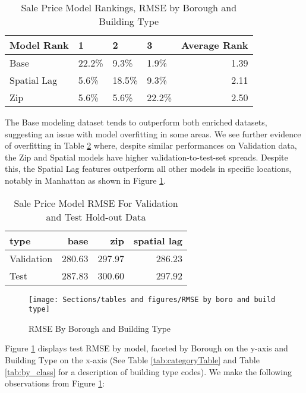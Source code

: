 \documentclass[12pt,]{article}
\begin{document}
\begin{table}

\caption{\label{tab:Sale Price Model Rank Distributions}\label{tab:SalePriceModelRank} Sale Price Model Rankings, RMSE by Borough and Building Type}
\centering
\begin{tabular}[t]{llllr}
\toprule
Model Rank & 1 & 2 & 3 & Average Rank\\
\midrule
Base & 22.2\% & 9.3\% & 1.9\% & 1.39\\
Spatial Lag & 5.6\% & 18.5\% & 9.3\% & 2.11\\
Zip & 5.6\% & 5.6\% & 22.2\% & 2.50\\
\bottomrule
\end{tabular}
\end{table}

The Base modeling dataset tends to outperform both enriched datasets,
suggesting an issue with model overfitting in some areas. We see further
evidence of overfitting in Table \ref{tab:SalePriceEval} where, despite
similar performances on Validation data, the Zip and Spatial models have
higher validation-to-test-set spreads. Despite this, the Spatial Lag
features outperform all other models in specific locations, notably in
Manhattan as shown in Figure \ref{fig:RMSE by boro and build type}.

\begin{table}

\caption{\label{tab:Sale Price Evaluations}\label{tab:SalePriceEval} Sale Price Model RMSE For Validation and Test Hold-out Data}
\centering
\begin{tabular}[t]{lrrr}
\toprule
type & base & zip & spatial lag\\
\midrule
Validation & 280.63 & 297.97 & 286.23\\
Test & 287.83 & 300.60 & 297.92\\
\bottomrule
\end{tabular}
\end{table}

\begin{figure}[H]
\texttt{[image: Sections/tables and figures/RMSE by boro and build type]} \caption{RMSE By Borough and Building Type}\label{fig:RMSE by boro and build type}
\end{figure}

Figure \ref{fig:RMSE by boro and build type} displays test RMSE by
model, faceted by Borough on the y-axis and Building Type on the x-axis
(See Table \ref{tab:categoryTable} and Table \ref{tab:by_class} for a
description of building type codes). We make the following observations
from Figure \ref{fig:RMSE by boro and build type}:
\end{document}

